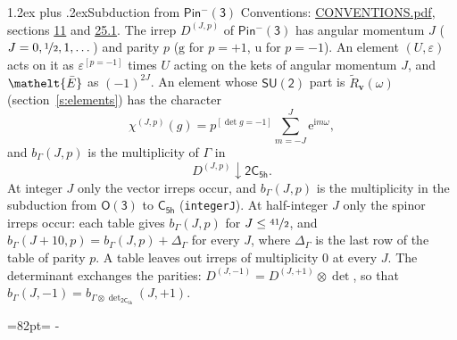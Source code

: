 \documentclass[10pt,a4paper]{article}
\makeatletter
\renewcommand\section{\@startsection{section}{1}{\z@}{-3ex plus -1ex minus -.2ex}%
  {1.2ex plus .2ex}{\normalfont\large\sffamily\bfseries\color{parttitle}}}
\newcommand{\needspace}[1]{\par\penalty-100\begingroup\dimen0=#1\relax\dimen2=\pagegoal
  \advance\dimen2-\pagetotal\ifdim\dimen0>\dimen2\relax\ifdim\dimen2>0pt\vfil\break\fi\fi
  \endgroup}
\numberwithin{equation}{section}
\newcommand{\eltfont}[1]{{\let\sigma\eltsigma\mathelt{#1}}}
\newcommand{\grp}[1]{\mathsf{#1}}
\newcommand{\elt}[1]{\eltfont{#1}}
\newcommand{\ptag}[1]{\mathrm{#1}}
\newcommand{\iverson}[1]{[#1]}
\newcommand{\restr}[2]{#1\!\downarrow#2}
\newcommand{\vv}{\mathbf{v}}
\newcommand{\iunit}{\mathrm{i}}
\newcommand{\expe}{\mathrm{e}}
\newcommand{\irrJp}[2]{D^{(#1,#2)}}
\newcommand{\irrprod}{\otimes}
\newcommand{\barred}[1]{\bar{#1}}
\newcommand{\lift}[1]{\tilde{#1}}
\makeatother
\begin{document}
\section{Subduction from \texorpdfstring{$\grp{Pin^{-}(3)}$}{Pin(3)}}\label{s:subduction_parent}
Conventions: \href{../../CONVENTIONS.pdf}{CONVENTIONS.pdf}, sections \href{../../../rotation/CONVENTIONS.pdf\#conv.11}{11} and \href{../../CONVENTIONS.pdf\#conv.25.1}{25.1}.
\leavevmode\label{n:index.J}\label{n:index.parity}\label{n:irrep.o3}The irrep $\irrJp{J}{p}$ of \href{Pinminus3.pdf}{$\grp{Pin^{-}(3)}$} has angular momentum $J$ ($J = 0, \nicefrac{1}{2}, 1, \dots$) and parity $p$ ($\ptag{g}$ for $p = +1$, $\ptag{u}$ for $p = -1$). An element $(U, \varepsilon)$ acts on it as $\varepsilon^{[p = -1]}$ times $U$ acting on the kets of angular momentum $J$, and $\elt{\barred{E}}$ as $(-1)^{2J}$. \label{n:function.character.parent}\label{n:function.multiplicity}An element whose $\grp{SU(2)}$ part is $\lift{R}_{\vv}(\omega)$ (section~\ref{s:elements}) has the character
\begin{equation}\label{e:chi}\chi^{(J,p)}(g) = p^{\iverson{\det g = -1}}\sum_{m=-J}^{J} \expe^{\iunit m\omega},\end{equation}
and $b_\Gamma(J, p)$ is the multiplicity of $\Gamma$ in
\begin{equation}\label{e:parent}\restr{\irrJp{J}{p}}{\grp{2C_{5h}}}.\end{equation}
At integer $J$ only the vector irreps occur, and $b_\Gamma(J, p)$ is the multiplicity in the subduction from $\grp{O(3)}$ to \href{../../../rotation/data/pdf/C5h.pdf}{$\grp{C_{5h}}$} (\texttt{integerJ}). \label{n:index.increment}At half-integer $J$ only the spinor irreps occur: each table gives $b_\Gamma(J, p)$ for $J \le \nicefrac{41}{2}$, and $b_\Gamma(J + 10, p) = b_\Gamma(J, p) + \Delta_\Gamma$ for every $J$, where $\Delta_\Gamma$ is the last row of the table of parity $p$. A table leaves out irreps of multiplicity 0 at every $J$.
\leavevmode\label{n:operator.determinant.character}The determinant exchanges the parities: $\irrJp{J}{-1} = \irrJp{J}{+1} \irrprod \det$, so that $b_\Gamma(J, -1) = b_{\Gamma \irrprod \det_{\grp{2C_{5h}}}}(J, +1)$.
\needspace{82pt}
\end{document}
